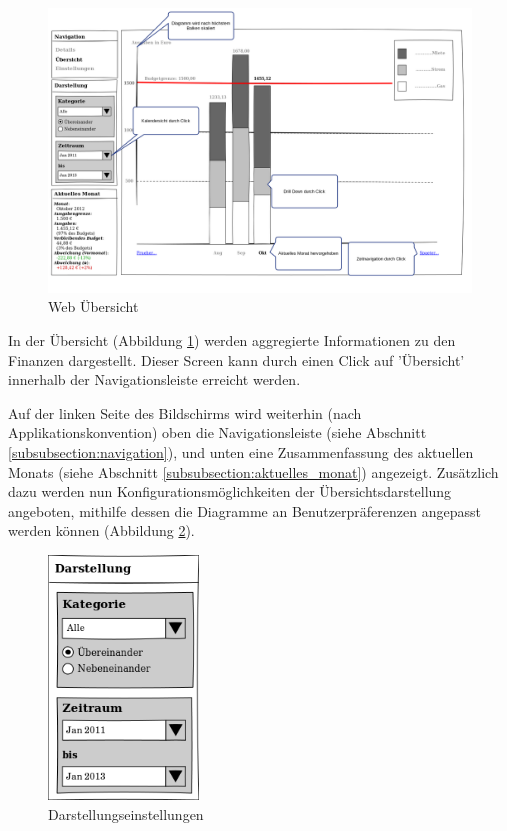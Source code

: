 \begin{figure}[htl]
\centering
\includegraphics[width=\textwidth]{img/web_uebersicht}
\caption{Web \"Ubersicht}
\label{fig:web_uebersicht}
\end{figure}

In der Übersicht (Abbildung \ref{fig:web_uebersicht}) werden aggregierte Informationen zu den Finanzen dargestellt.
Dieser Screen kann durch einen Click auf 'Übersicht' innerhalb der
Navigationsleiste erreicht werden.

Auf der linken Seite des Bildschirms wird weiterhin (nach
Applikationskonvention) oben die Navigationsleiste (siehe Abschnitt
\ref{subsubsection:navigation}), und unten eine Zusammenfassung des aktuellen
Monats (siehe Abschnitt \ref{subsubsection:aktuelles_monat}) angezeigt.
Zusätzlich dazu werden nun Konfigurationsmöglichkeiten der
Übersichtsdarstellung angeboten, mithilfe dessen die Diagramme an
Benutzerpräferenzen angepasst werden können (Abbildung \ref{fig:web_display_settings}).

\begin{figure}[htl]
\centering
\includegraphics[width=4cm]{img/web_display_settings}
\caption{Darstellungseinstellungen}
\label{fig:web_display_settings}
\end{figure}

